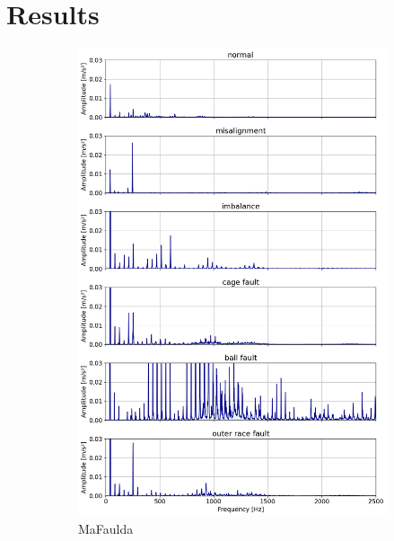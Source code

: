 \documentclass{llncs}
\begin{document}
\section{Results}
\begin{figure}
     \begin{subfigure}[b]{0.3\textwidth}
         \centering
         \includegraphics[width=\textwidth]{fig/spectrum/mafaulda-wideband.png}
         \caption{MaFaulda}
         \label{fig:mafaulda-wideband}
     \end{subfigure}
     \hfill
     \begin{subfigure}[b]{0.3\textwidth}
         \centering

\end{subfigure}
\end{figure}
\end{document}
